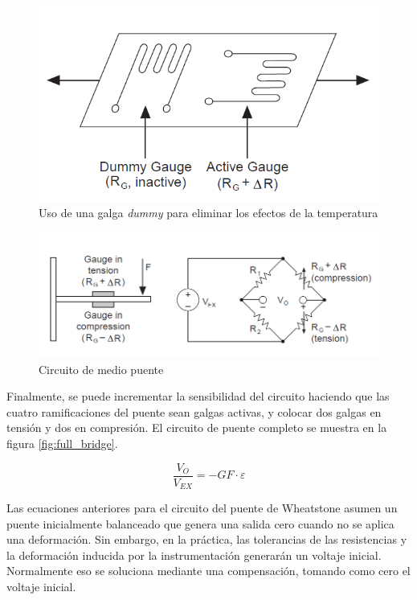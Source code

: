 \begin{figure}[H]
\centering
\includegraphics[scale=0.65]{src/ch2/dummy_gauge.png}
\caption{Uso de una galga \textit{dummy} para eliminar los efectos de la temperatura}
\label{fig:dummy_gauge}
\end{figure}

\begin{figure}[H]
\centering
\includegraphics[scale=0.65]{src/ch2/half_bridge.png}
\caption{Circuito de medio puente}
\label{fig:half_bridge}
\end{figure}

Finalmente, se puede incrementar la sensibilidad del circuito haciendo que las cuatro 
ramificaciones del puente sean galgas activas, y colocar dos galgas en tensión y dos en 
compresión. El circuito de puente completo se muestra en la figura \ref{fig:full_bridge}. ~\cite{gageNI}

\begin{equation}
\frac{V_{O}}{V_{EX}} = -GF\cdot \varepsilon
\end{equation}

Las ecuaciones anteriores para el circuito del puente de Wheatstone asumen un 
puente inicialmente balanceado que genera una salida cero cuando no se aplica una 
deformación. Sin embargo, en la práctica, las tolerancias de las resistencias y 
la deformación inducida por la instrumentación generarán un voltaje inicial. 
Normalmente eso se soluciona mediante una compensación, tomando como cero el 
voltaje inicial.

